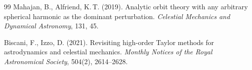 \documentclass[11pt]{article}
\begin{document}
\begin{thebibliography}{99}
Mahajan, B., Alfriend, K.\,T. (2019).
Analytic orbit theory with any arbitrary spherical harmonic as the
dominant perturbation.
\textit{Celestial Mechanics and Dynamical Astronomy}, 131, 45.

Biscani, F., Izzo, D. (2021).
Revisiting high-order Taylor methods for astrodynamics and celestial
mechanics.
\textit{Monthly Notices of the Royal Astronomical Society}, 504(2),
2614--2628.

\end{thebibliography}
\end{document}
